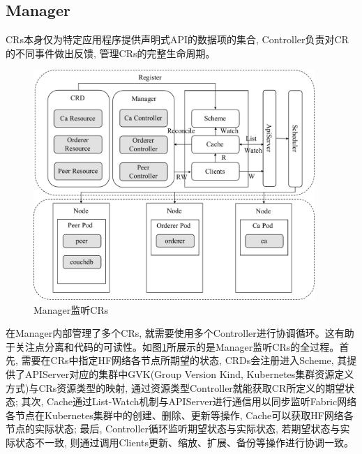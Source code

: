 \subsection{Manager}

CRs本身仅为特定应用程序提供声明式API的数据项的集合, Controller负责对CR的不同事件做出反馈, 管理CRs的完整生命周期。

\begin{figure}[h] %
    \centering %
    \includegraphics[width=0.95\textwidth]{FIGs/chapter4/manager.pdf} %
    \caption{Manager监听CRs} %
    \label{manager} %
\end{figure}%

在Manager内部管理了多个CRs, 就需要使用多个Controller进行协调循环。这有助于关注点分离和代码的可读性。如图\ref{manager}所展示的是Manager监听CRs的全过程。首先, 需要在CRs中指定HF网络各节点所期望的状态, CRDs会注册进入Scheme, 其提供了APIServer对应的集群中GVK(Group Version Kind, Kubernetes集群资源定义方式)与CRs资源类型的映射, 通过资源类型Controller就能获取CR所定义的期望状态; 其次, Cache通过List-Watch机制与APIServer进行通信用以同步监听Fabric网络各节点在Kubernetes集群中的创建、删除、更新等操作, Cache可以获取HF网络各节点的实际状态; 最后, Controller循环监听期望状态与实际状态, 若期望状态与实际状态不一致, 则通过调用Clients更新、缩放、扩展、备份等操作进行协调一致。

